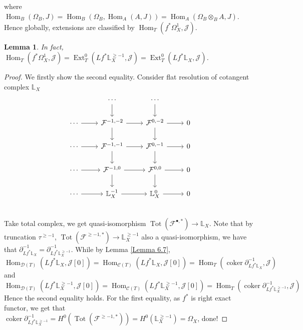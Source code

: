 \documentclass{ctexart}
\newtheorem{lemma}{Lemma}[section]
\renewcommand{\hom}{\operatorname{Hom}}
\newcommand{\ext}{\operatorname{Ext}}
\newcommand{\coker}{\operatorname{coker}}
\newcommand{\totalcomplex}{\operatorname{Tot}}
\begin{document}
where $\hom_{B}(\Omega_{B}, J) = \hom_{B}(\Omega_{B}, \hom_{A}(A, J)) = \hom_{A}(\Omega_{B} \otimes_{B} A, J)$.
Hence globally, extensions are classified by $\hom_{T}(f^{\ast}\Omega_{X}^{1}, \mathcal{J})$.
\begin{lemma}
    In fact, $\hom_{T}(f^{\ast}\Omega_{X}^{1}, \mathcal{J}) = \ext_{T}^{0}(Lf^{\ast}\mathbb{L}_{X}^{\ge -1}, \mathcal{J}) = \ext_{T}^{0}(Lf^{\ast}\mathbb{L}_{X}, \mathcal{J})$.
    \label{Lemma 7.5}
\end{lemma}
\begin{proof}
    We firstly show the second equality.
    Consider flat resolution of cotangent complex $\mathbb{L}_{X}$
    \begin{equation}
        \begin{tikzcd}
            & \cdots \arrow[d] &
            \cdots \arrow[d] & \\
            \cdots \arrow[r] &
            \mathcal{F}^{-1, -2} \arrow[r] \arrow[d] &
            \mathcal{F}^{0, -2} \arrow[r] \arrow[d] &
            0 \\
            \cdots \arrow[r] &
            \mathcal{F}^{-1, -1} \arrow[r] \arrow[d] &
            \mathcal{F}^{0, -1} \arrow[r] \arrow[d] &
            0 \\
            \cdots \arrow[r] &
            \mathcal{\mathcal{F}}^{-1, 0} \arrow[r] \arrow[d] &
            \mathcal{\mathcal{F}}^{0, 0} \arrow[r] \arrow[d] &
            0 \\
            \cdots \arrow[r] &
            \mathbb{L}_{X}^{-1} \arrow[r] &
            \mathbb{L}_{X}^{0} \arrow[r] &
            0 \\
        \end{tikzcd}
    \end{equation}
    Take total complex, we get quasi-isomorphism $\totalcomplex (\mathcal{F}^{\bullet, \ast}) \rightarrow \mathbb{L}_{X}$.
    Note that by truncation $\tau^{\ge -1}$, $\totalcomplex (\mathcal{F}^{\ge -1, \ast}) \rightarrow \mathbb{L}_{X}^{\ge -1}$ also a quasi-isomorphism,
    we have that $\partial_{Lf^{\ast}\mathbb{L}_{X}}^{-1} = \partial_{Lf^{\ast}\mathbb{L}_{X}^{\ge -1}}^{-1}$.
    While by Lemma \ref{Lemma 6.7}, 
    \begin{equation}
        \hom_{\mathcal{D}(T)}(Lf^{\ast}\mathbb{L}_{X}, \mathcal{J}[0]) = \hom_{\mathcal{C}(T)}(Lf^{\ast}\mathbb{L}_{X}, \mathcal{J}[0]) = \hom_{T}(\coker \partial_{Lf^{\ast}\mathbb{L}_{X}}^{-1}, \mathcal{J})
    \end{equation}
    and
    \begin{equation}
        \hom_{\mathcal{D}(T)}(Lf^{\ast}\mathbb{L}_{X}^{\ge -1}, \mathcal{J}[0]) = \hom_{\mathcal{C}(T)}(Lf^{\ast}\mathbb{L}_{X}^{\ge -1}, \mathcal{J}[0]) = \hom_{T}(\coker \partial_{Lf^{\ast}\mathbb{L}_{X}^{\ge -1}}^{-1}, \mathcal{J})
    \end{equation}
    Hence the second equality holds.
    For the first equality, as $f^{\ast}$ is right exact functor,
    we get that $\coker \partial_{Lf^{\ast}\mathbb{L}_{X}^{\ge -1}}^{-1} = H^{0}(\totalcomplex (\mathcal{F}^{\ge -1, \ast})) = H^{0}(\mathbb{L}_{X}^{\ge -1}) = \Omega_{X}$, done!
\end{proof}
\end{document}
